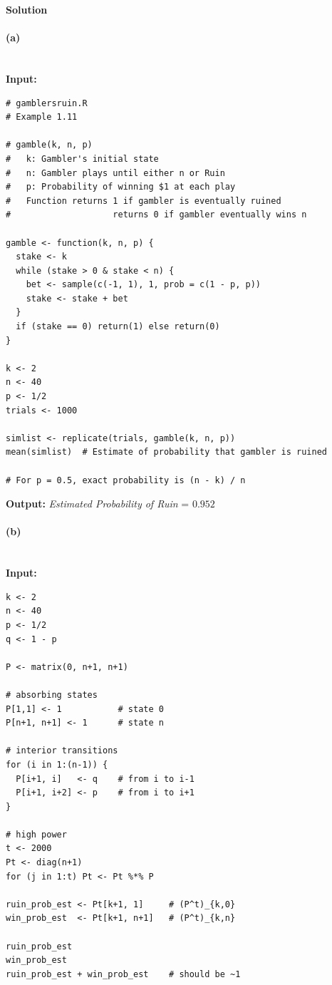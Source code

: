 \documentclass[hidelinks]{article}
\begin{document}
\noindent \textbf{Solution}

\paragraph{(a)}\mbox{}\\
\noindent\textbf{Input:}

\begin{lstlisting}[caption={Gambler's Ruin Simulation in R}]
# gamblersruin.R
# Example 1.11

# gamble(k, n, p)
#   k: Gambler's initial state
#   n: Gambler plays until either n or Ruin
#   p: Probability of winning $1 at each play
#   Function returns 1 if gambler is eventually ruined
#                    returns 0 if gambler eventually wins n

gamble <- function(k, n, p) {
  stake <- k
  while (stake > 0 & stake < n) {
    bet <- sample(c(-1, 1), 1, prob = c(1 - p, p))
    stake <- stake + bet
  }
  if (stake == 0) return(1) else return(0)
}

k <- 2
n <- 40
p <- 1/2
trials <- 1000

simlist <- replicate(trials, gamble(k, n, p))
mean(simlist)  # Estimate of probability that gambler is ruined

# For p = 0.5, exact probability is (n - k) / n
\end{lstlisting}


\noindent\textbf{Output:} \textit{Estimated {Probability of Ruin}} = \(\boxed{0.952}\)

\paragraph{(b)}\mbox{}\\
\noindent\textbf{Input:}

\begin{lstlisting}[caption={Gambler's Ruin Simulation in R}]
k <- 2
n <- 40
p <- 1/2
q <- 1 - p

P <- matrix(0, n+1, n+1)

# absorbing states
P[1,1] <- 1           # state 0
P[n+1, n+1] <- 1      # state n

# interior transitions
for (i in 1:(n-1)) {
  P[i+1, i]   <- q    # from i to i-1
  P[i+1, i+2] <- p    # from i to i+1
}

# high power
t <- 2000
Pt <- diag(n+1)
for (j in 1:t) Pt <- Pt %*% P

ruin_prob_est <- Pt[k+1, 1]     # (P^t)_{k,0}
win_prob_est  <- Pt[k+1, n+1]   # (P^t)_{k,n}

ruin_prob_est
win_prob_est
ruin_prob_est + win_prob_est    # should be ~1
\end{lstlisting}
\end{document}
